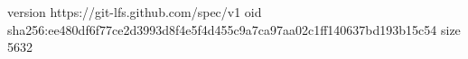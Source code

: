 version https://git-lfs.github.com/spec/v1
oid sha256:ee480df6f77ce2d3993d8f4e5f4d455c9a7ca97aa02c1ff140637bd193b15c54
size 5632
